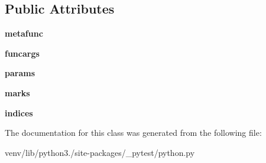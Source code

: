 \subsection*{Public Attributes}
\begin{DoxyCompactItemize}
\item 
\mbox{\label{class__pytest_1_1python_1_1_call_spec2_ae015e6be82e07ce5c57fa8e44049e29f}} 
{\bfseries metafunc}
\item 
\mbox{\label{class__pytest_1_1python_1_1_call_spec2_a4c4b60bff0fe9e3d2294a10190876e36}} 
{\bfseries funcargs}
\item 
\mbox{\label{class__pytest_1_1python_1_1_call_spec2_a342c7b4ca25bafa9f23abbfd8c841cc4}} 
{\bfseries params}
\item 
\mbox{\label{class__pytest_1_1python_1_1_call_spec2_a18859e7836e64d3e1eb5f31807b9a42c}} 
{\bfseries marks}
\item 
\mbox{\label{class__pytest_1_1python_1_1_call_spec2_a5f7044dae932c6c9daed8ef4ff18573d}} 
{\bfseries indices}
\end{DoxyCompactItemize}


The documentation for this class was generated from the following file\+:\begin{DoxyCompactItemize}
\item 
venv/lib/python3./site-\/packages/\+\_\+pytest/python.\+py\end{DoxyCompactItemize}
